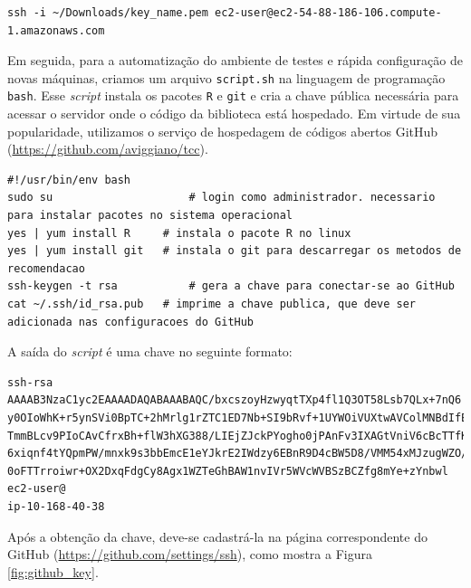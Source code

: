 \begin{lstlisting}[caption=Secure shell para conexão com a máquina virtual EC2]
ssh -i ~/Downloads/key_name.pem ec2-user@ec2-54-88-186-106.compute-1.amazonaws.com
\end{lstlisting}

Em seguida, para a automatização do ambiente de testes e rápida configuração de novas máquinas, criamos um arquivo \texttt{script.sh} na linguagem de programação \texttt{bash}. Esse \textit{script} instala os pacotes \texttt{R} e \texttt{git} e cria a chave pública necessária para acessar o servidor onde o código da biblioteca está hospedado. Em virtude de sua popularidade, utilizamos o serviço de hospedagem de códigos abertos GitHub (\url{https://github.com/aviggiano/tcc}). 

\begin{lstlisting}[caption=\textit{Script} de configuração do ambiente de testes]
#!/usr/bin/env bash
sudo su						# login como administrador. necessario para instalar pacotes no sistema operacional
yes | yum install R		# instala o pacote R no linux
yes | yum install git	# instala o git para descarregar os metodos de recomendacao
ssh-keygen -t rsa			# gera a chave para conectar-se ao GitHub
cat ~/.ssh/id_rsa.pub	# imprime a chave publica, que deve ser adicionada nas configuracoes do GitHub
\end{lstlisting}

A saída do \textit{script} é uma chave no seguinte formato:

\begin{lstlisting}[caption=Chave pública]
ssh-rsa AAAAB3NzaC1yc2EAAAADAQABAAABAQC/bxcszoyHzwyqtTXp4fl1Q3OT58Lsb7QLx+7nQ6
y0OIoWhK+r5ynSVi0BpTC+2hMrlg1rZTC1ED7Nb+SI9bRvf+1UYWOiVUXtwAVColMNBdIfE7QCWbJm
TmmBLcv9PIoCAvCfrxBh+flW3hXG388/LIEjZJckPYogho0jPAnFv3IXAGtVniV6cBcTTfKPUnX+np
6xiqnf4tYQpmPW/mnxk9s3bbEmcE1eYJkrE2IWdzy6EBnR9D4cBW5D8/VMM54xMJzugWZO//sIjLLT
0oFTTrroiwr+OX2DxqFdgCy8Agx1WZTeGhBAW1nvIVr5WVcWVBSzBCZfg8mYe+zYnbwl ec2-user@
ip-10-168-40-38
\end{lstlisting}

Após a obtenção da chave, deve-se cadastrá-la na página correspondente do GitHub (\url{https://github.com/settings/ssh}), como mostra a Figura \ref{fig:github_key}.

